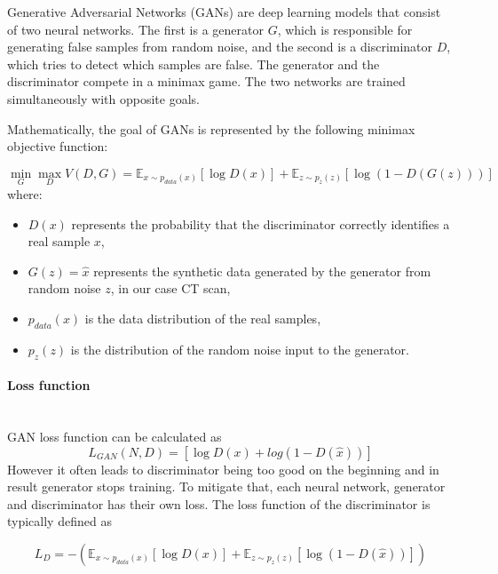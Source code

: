 Generative Adversarial Networks (GANs) are deep learning models that consist of two neural networks.
The first is a generator \( G \), which is responsible for generating false samples from random noise, and the second is a discriminator \( D \), which tries to detect which samples are false.
The generator and the discriminator compete in a minimax game. The two networks are trained simultaneously with opposite goals.

Mathematically, the goal of GANs is represented by the following minimax objective function:

\begin{equation}
\min_G \max_D V(D, G) = \mathbb{E}_{x \sim p_{data}(x)}[\log D(x)] + \mathbb{E}_{z \sim p_z(z)}[\log (1 - D(G(z)))]
\end{equation}
where:

\begin{itemize}
\item \( D(x) \) represents the probability that the discriminator correctly identifies a real sample \( x \),

\item \( G(z)=\hat{x} \) represents the synthetic data generated by the generator from random noise \( z \), in our case CT scan,

\item \( p_{data}(x) \) is the data distribution of the real samples,

\item \( p_z(z) \) is the distribution of the random noise input to the generator.
\end{itemize}

\paragraph{Loss function}\mbox{}\\
\indent GAN loss function can be calculated as
\begin{equation}
    L_{GAN}(N,D) = [\log D(x) + log(1-D(\hat{x}))]
\label{loss_gan}
\end{equation}
However it often leads to discriminator being too good on the beginning and in result generator stops training. To mitigate that, each neural network, generator and discriminator has their own loss.
The loss function of the discriminator is typically defined as

\begin{equation}
L_D = - \left( \mathbb{E}_{x \sim p_{data}(x)}[\log D(x)] + \mathbb{E}_{z \sim p_z(z)}[\log (1 - D(\hat{x}))] \right)
\end{equation}


